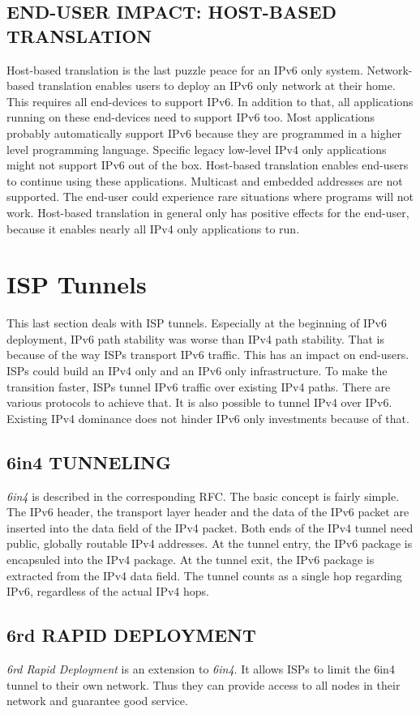 \documentclass[format=sigconf, natbib=true, nonacm=true]{acmart}
\begin{document}
    \subsection*{END-USER IMPACT: HOST-BASED TRANSLATION}
    Host-based translation is the last puzzle peace for an IPv6 only system. Network-based translation enables users to deploy an IPv6 only network at their home. This requires all end-devices to support IPv6. In addition to that, all applications running on these end-devices need to support IPv6 too. Most applications probably automatically support IPv6 because they are programmed in a higher level programming language. Specific legacy low-level IPv4 only applications might not support IPv6 out of the box. Host-based translation enables end-users to continue using these applications. Multicast and embedded addresses are not supported. The end-user could experience rare situations where programs will not work. Host-based translation in general only has positive effects for the end-user, because it enables nearly all IPv4 only applications to run.
    \section{ISP Tunnels}
    This last section deals with ISP tunnels. Especially at the beginning of IPv6 deployment, IPv6 path stability was worse than IPv4 path stability\cite{7119767}. That is because of the way ISPs transport IPv6 traffic. This has an impact on end-users. ISPs could build an IPv4 only and an IPv6 only infrastructure. To make the transition faster, ISPs tunnel IPv6 traffic over existing IPv4 paths. There are various protocols to achieve that. It is also possible to tunnel IPv4 over IPv6. Existing IPv4 dominance does not hinder IPv6 only investments because of that.
    \subsection{6in4 TUNNELING}
    \textit{6in4} is described in the corresponding RFC\cite{rfc4213}. The basic concept is fairly simple. The IPv6 header, the transport layer header and the data of the IPv6 packet are inserted into the data field of the IPv4 packet. Both ends of the IPv4 tunnel need public, globally routable IPv4 addresses. At the tunnel entry, the IPv6 package is encapsuled into the IPv4 package. At the tunnel exit, the IPv6 package is extracted from the IPv4 data field. The tunnel counts as a single hop regarding IPv6, regardless of the actual IPv4 hops.
    \subsection{6rd RAPID DEPLOYMENT}
    \textit{6rd Rapid Deployment} is an extension to \textit{6in4}. It allows ISPs to limit the 6in4 tunnel to their own network. Thus they can provide access to all nodes in their network and guarantee good service.
\end{document}
